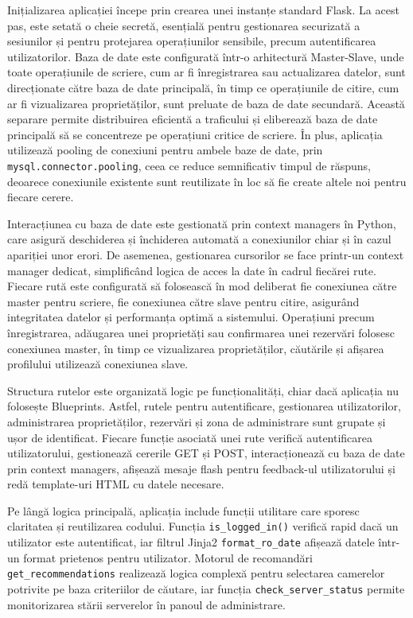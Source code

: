 \documentclass[12pt, a4paper, oneside, romanian]{teza-upb}
\begin{document}
Inițializarea aplicației începe prin crearea unei instanțe standard Flask. La acest pas, este setată o cheie secretă, esențială pentru gestionarea securizată a sesiunilor și pentru protejarea operațiunilor sensibile, precum autentificarea utilizatorilor. Baza de date este configurată într-o arhitectură Master-Slave, unde toate operațiunile de scriere, cum ar fi înregistrarea sau actualizarea datelor, sunt direcționate către baza de date principală, în timp ce operațiunile de citire, cum ar fi vizualizarea proprietăților, sunt preluate de baza de date secundară. Această separare permite distribuirea eficientă a traficului și eliberează baza de date principală să se concentreze pe operațiuni critice de scriere. În plus, aplicația utilizează pooling de conexiuni pentru ambele baze de date, prin \texttt{mysql.connector.pooling}, ceea ce reduce semnificativ timpul de răspuns, deoarece conexiunile existente sunt reutilizate în loc să fie create altele noi pentru fiecare cerere.  

Interacțiunea cu baza de date este gestionată prin context managers în Python, care asigură deschiderea și închiderea automată a conexiunilor chiar și în cazul apariției unor erori. De asemenea, gestionarea cursorilor se face printr-un context manager dedicat, simplificând logica de acces la date în cadrul fiecărei rute. Fiecare rută este configurată să folosească în mod deliberat fie conexiunea către master pentru scriere, fie conexiunea către slave pentru citire, asigurând integritatea datelor și performanța optimă a sistemului. Operațiuni precum înregistrarea, adăugarea unei proprietăți sau confirmarea unei rezervări folosesc conexiunea master, în timp ce vizualizarea proprietăților, căutările și afișarea profilului utilizează conexiunea slave.  

Structura rutelor este organizată logic pe funcționalități, chiar dacă aplicația nu folosește Blueprints. Astfel, rutele pentru autentificare, gestionarea utilizatorilor, administrarea proprietăților, rezervări și zona de administrare sunt grupate și ușor de identificat. Fiecare funcție asociată unei rute verifică autentificarea utilizatorului, gestionează cererile GET și POST, interacționează cu baza de date prin context managers, afișează mesaje flash pentru feedback-ul utilizatorului și redă template-uri HTML cu datele necesare.  

Pe lângă logica principală, aplicația include funcții utilitare care sporesc claritatea și reutilizarea codului. Funcția \texttt{is\_logged\_in()} verifică rapid dacă un utilizator este autentificat, iar filtrul Jinja2 \texttt{format\_ro\_date} afișează datele într-un format prietenos pentru utilizator. Motorul de recomandări \texttt{get\_recommendations} realizează logica complexă pentru selectarea camerelor potrivite pe baza criteriilor de căutare, iar funcția \texttt{check\_server\_status} permite monitorizarea stării serverelor în panoul de administrare.  
\end{document}
